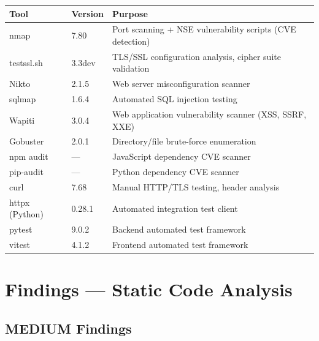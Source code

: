 \documentclass[11pt,a4paper]{article}
\begin{document}
\begin{center}
\begin{tabularx}{\textwidth}{llX}
\toprule
\textbf{Tool} & \textbf{Version} & \textbf{Purpose} \\
\midrule
nmap & 7.80 & Port scanning + NSE vulnerability scripts (CVE detection) \\
testssl.sh & 3.3dev & TLS/SSL configuration analysis, cipher suite validation \\
Nikto & 2.1.5 & Web server misconfiguration scanner \\
sqlmap & 1.6.4 & Automated SQL injection testing \\
Wapiti & 3.0.4 & Web application vulnerability scanner (XSS, SSRF, XXE) \\
Gobuster & 2.0.1 & Directory/file brute-force enumeration \\
npm audit & --- & JavaScript dependency CVE scanner \\
pip-audit & --- & Python dependency CVE scanner \\
curl & 7.68 & Manual HTTP/TLS testing, header analysis \\
httpx (Python) & 0.28.1 & Automated integration test client \\
pytest & 9.0.2 & Backend automated test framework \\
vitest & 4.1.2 & Frontend automated test framework \\
\bottomrule
\end{tabularx}
\end{center}

\newpage
\section{Findings --- Static Code Analysis}

\subsection{MEDIUM Findings}
\end{document}
